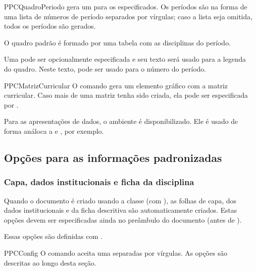 \documentclass[a4paper, 11pt]{article}
\begin{document}
\begin{Macrodef}{PPCQuadroPeriodo}{}{}
     gera um  para os  especificados. Os períodos são na forma de uma lista de números de período separados por vírgulas; caso a lista seja omitida, todos os períodos são gerados.

    O quadro padrão é formado por uma tabela com as disciplinas do período.

    Uma  pode ser opcionalmente especificada e seu texto será usado para a legenda do quadro. Neste texto,  pode ser usado para o número do período.
\end{Macrodef}

\begin{Macrodef}{PPCMatrizCurricular}{}{}
    O comando  gera um elemento gráfico com a matriz curricular. Caso mais de uma matriz tenha sido criada, ela pode ser especificada por .
\end{Macrodef}

Para as apresentações de dados, o ambiente  é disponibilizado. Ele é usado de forma análoca a  e , por exemplo.

\subsection{Opções para as informações padronizadas}

\subsubsection{Capa, dados institucionais e ficha da disciplina}
Quando o documento é criado usando a classe  (com ), as folhas de capa, dos dados institucionais e da ficha descritiva são automaticamente criados. Estas opções devem ser especificadas ainda no preâmbulo do documento (antes de \PDInline{\begin{document}}).

Essas opções são definidas com .

\begin{Macrodef}{PPCConfig}{}{}
    O comando  aceita uma  separadas por vírgulas. As opções são descritas ao longo desta seção.
\end{Macrodef}
\end{document}
